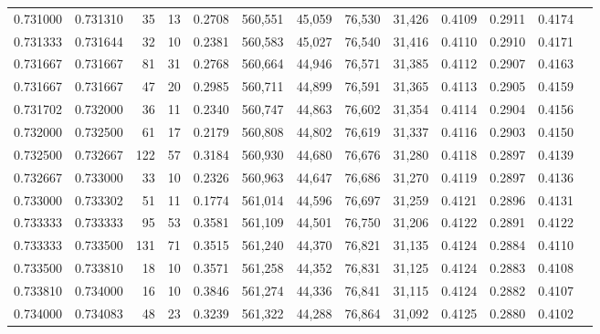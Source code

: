 \begin{tabular}{rrrrrrrrrrrrr}
0.731000 & 0.731310 &    35 &  13 &                                     0.2708 & 560,551 &  45,059 &  76,530 &  31,426 & 0.4109 & 0.2911 & 0.4174 \\
0.731333 & 0.731644 &    32 &  10 &                                     0.2381 & 560,583 &  45,027 &  76,540 &  31,416 & 0.4110 & 0.2910 & 0.4171 \\
0.731667 & 0.731667 &    81 &  31 &                                     0.2768 & 560,664 &  44,946 &  76,571 &  31,385 & 0.4112 & 0.2907 & 0.4163 \\
0.731667 & 0.731667 &    47 &  20 &                                     0.2985 & 560,711 &  44,899 &  76,591 &  31,365 & 0.4113 & 0.2905 & 0.4159 \\
0.731702 & 0.732000 &    36 &  11 &                                     0.2340 & 560,747 &  44,863 &  76,602 &  31,354 & 0.4114 & 0.2904 & 0.4156 \\
0.732000 & 0.732500 &    61 &  17 &                                     0.2179 & 560,808 &  44,802 &  76,619 &  31,337 & 0.4116 & 0.2903 & 0.4150 \\
0.732500 & 0.732667 &   122 &  57 &                                     0.3184 & 560,930 &  44,680 &  76,676 &  31,280 & 0.4118 & 0.2897 & 0.4139 \\
0.732667 & 0.733000 &    33 &  10 &                                     0.2326 & 560,963 &  44,647 &  76,686 &  31,270 & 0.4119 & 0.2897 & 0.4136 \\
0.733000 & 0.733302 &    51 &  11 &                                     0.1774 & 561,014 &  44,596 &  76,697 &  31,259 & 0.4121 & 0.2896 & 0.4131 \\
0.733333 & 0.733333 &    95 &  53 &                                     0.3581 & 561,109 &  44,501 &  76,750 &  31,206 & 0.4122 & 0.2891 & 0.4122 \\
0.733333 & 0.733500 &   131 &  71 &                                     0.3515 & 561,240 &  44,370 &  76,821 &  31,135 & 0.4124 & 0.2884 & 0.4110 \\
0.733500 & 0.733810 &    18 &  10 &                                     0.3571 & 561,258 &  44,352 &  76,831 &  31,125 & 0.4124 & 0.2883 & 0.4108 \\
0.733810 & 0.734000 &    16 &  10 &                                     0.3846 & 561,274 &  44,336 &  76,841 &  31,115 & 0.4124 & 0.2882 & 0.4107 \\
0.734000 & 0.734083 &    48 &  23 &                                     0.3239 & 561,322 &  44,288 &  76,864 &  31,092 & 0.4125 & 0.2880 & 0.4102 \\

\end{tabular}
